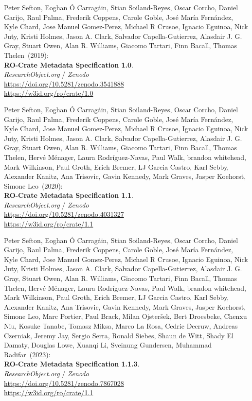\begin{thebibliography}{9}
Peter Sefton, Eoghan Ó Carragáin, Stian Soiland-Reyes, Oscar
Corcho, Daniel Garijo, Raul Palma, Frederik Coppens, Carole Goble, José
María Fernández, Kyle Chard, Jose Manuel Gomez-Perez, Michael R Crusoe,
Ignacio Eguinoa, Nick Juty, Kristi Holmes, Jason A. Clark, Salvador
Capella-Gutierrez, Alasdair J. G. Gray, Stuart Owen, Alan R. Williams,
Giacomo Tartari, Finn Bacall, Thomas Thelen~(2019):\\
\textbf{RO-Crate Metadata Specification 1.0}.\\
\emph{ResearchObject.org} / \emph{Zenodo}\\
\url{https://doi.org/10.5281/zenodo.3541888}\\
\url{https://w3id.org/ro/crate/1.0}

Peter Sefton, Eoghan Ó Carragáin, Stian Soiland-Reyes, Oscar
Corcho, Daniel Garijo, Raul Palma, Frederik Coppens, Carole Goble, José
María Fernández, Kyle Chard, Jose Manuel Gomez-Perez, Michael R Crusoe,
Ignacio Eguinoa, Nick Juty, Kristi Holmes, Jason A. Clark, Salvador
Capella-Gutierrez, Alasdair J. G. Gray, Stuart Owen, Alan R. Williams,
Giacomo Tartari, Finn Bacall, Thomas Thelen, Hervé Ménager, Laura
Rodríguez-Navas, Paul Walk, brandon whitehead, Mark Wilkinson, Paul
Groth, Erich Bremer, LJ Garcia Castro, Karl Sebby, Alexander Kanitz, Ana
Trisovic, Gavin Kennedy, Mark Graves, Jasper Koehorst, Simone Leo~(2020):\\
\textbf{RO-Crate Metadata Specification 1.1}.\\
\emph{ResearchObject.org} / \emph{Zenodo}\\
\url{https://doi.org/10.5281/zenodo.4031327}\\
\url{https://w3id.org/ro/crate/1.1}

Peter Sefton, Eoghan Ó Carragáin, Stian Soiland-Reyes, Oscar
Corcho, Daniel Garijo, Raul Palma, Frederik Coppens, Carole Goble, José
María Fernández, Kyle Chard, Jose Manuel Gomez-Perez, Michael R Crusoe,
Ignacio Eguinoa, Nick Juty, Kristi Holmes, Jason A. Clark, Salvador
Capella-Gutierrez, Alasdair J. G. Gray, Stuart Owen, Alan R. Williams,
Giacomo Tartari, Finn Bacall, Thomas Thelen, Hervé Ménager, Laura
Rodríguez-Navas, Paul Walk, brandon whitehead, Mark Wilkinson, Paul
Groth, Erich Bremer, LJ Garcia Castro, Karl Sebby, Alexander Kanitz, Ana
Trisovic, Gavin Kennedy, Mark Graves, Jasper Koehorst, Simone Leo, Marc
Portier, Paul Brack, Milan Ojsteršek, Bert Droesbeke, Chenxu Niu, Kosuke Tanabe, Tomasz Miksa, Marco La Rosa, Cedric Decruw, Andreas Czerniak, Jeremy Jay, Sergio Serra, Ronald Siebes, Shaun de Witt, Shady El Damaty, Douglas Lowe, Xuanqi Li, Sveinung Gundersen, Muhammad Radifar~(2023):\\
\textbf{RO-Crate Metadata Specification 1.1.3}.\\
\emph{ResearchObject.org} / \emph{Zenodo}\\
\url{https://doi.org/10.5281/zenodo.7867028}\\
\url{https://w3id.org/ro/crate/1.1}


\end{thebibliography}
